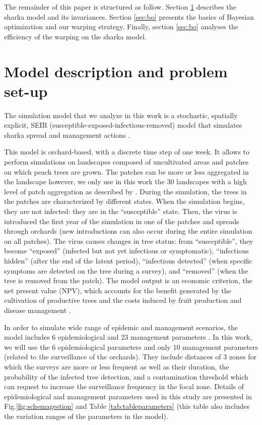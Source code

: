 The remainder of this paper is structured as follow. Section \ref{sec:model} describes the sharka model and its invariances.
Section \ref{sec:bo} presents the basics of Bayesian optimization and our warping strategy. Finally, section \ref{sec:bo}
analyses the efficiency of the warping on the sharka model.

\section{Model description and problem set-up}\label{sec:model}

The simulation model that we analyze in this work is a stochastic, spatially explicit, SEIR (susceptible-exposed-infectious-removed) model that simulates sharka spread and management actions 
\citep[including surveillance, removals and replantations][]{pleydell2018estimation,rimbaud2018using,rimbaud2018heuristic}.

This model is orchard-based, with a discrete time step of one week. It allows to perform simulations on landscapes composed of uncultivated areas and patches on which peach trees are grown. 
The patches can be more or less aggregated in the landscape however, we only use in this work the 30 landscapes with a high level of patch aggregation as described by \cite{picard2018}. 
During the simulation, the trees in the patches are characterized by different states. When the simulation begins, they are not infected: they are in the ``susceptible'' state. 
Then, the virus is introduced the first year of the simulation in one of the patches and spreads through orchards (new introductions can also occur during the entire simulation on all patches).
 The virus causes changes in tree status: from ``susceptible'', they become ``exposed'' (infected but not yet infectious or symptomatic), ``infectious hidden'' (after the end of the latent period), 
 ``infectious detected'' (when specific symptoms are detected on the tree during a survey), and ``removed'' (when the tree is removed from the patch). 
The model output is an economic criterion, the net present value (NPV), which accounts for the benefit generated by the cultivation of productive trees 
and the costs induced by fruit production and disease management \cite{rimbaud2018heuristic}.

In order to simulate wide range of epidemic and management scenarios, the model includes 6 epidemiological and 23 management parameters \cite{rimbaud2018heuristic,picard2018}. 
In this work, we will use the 6 epidemiological parameters and only 10 management parameters (related to the surveillance of the orchards). 
They include distances of 3 zones for which the surveys are more or less frequent as well as their duration, the probability of the infected tree detection, 
and a contamination threshold which can request to increase the surveillance frequency in the focal zone. 
Details of epidemiological and management parameters used in this study are presented in Fig.\ref{fig:schemagestion} and Table \ref{tab:tableparameters} 
(this table also includes the variation ranges of the parameters in the model).

